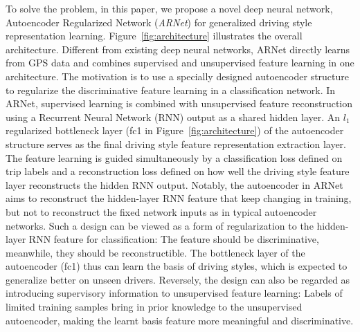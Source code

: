 \documentclass{article}
\begin{document}
To solve the problem, in this paper, we propose a novel deep neural network, {A}utoencoder {R}egularized {Net}work (\emph{ARNet}) for generalized driving style representation learning.
Figure~\ref{fig:architecture} illustrates the overall architecture.
Different from existing deep neural networks, ARNet directly learns from GPS data and combines supervised and unsupervised feature learning in one architecture.
The motivation is to use a specially designed autoencoder structure to regularize the discriminative feature learning in a classification network.
In ARNet, %
supervised learning is combined with unsupervised feature reconstruction using a Recurrent Neural Network (RNN) \cite{elman1990finding,chung2014empirical} output as a shared hidden layer.
An $l_1$ regularized bottleneck layer (fc1 in Figure~\ref{fig:architecture}) of the autoencoder structure %
serves as the final driving style feature representation extraction layer.
The feature learning is guided simultaneously by a classification loss defined on trip labels and a reconstruction loss defined on how well the driving style feature layer reconstructs the hidden RNN output.
Notably, the autoencoder in ARNet aims to reconstruct the hidden-layer RNN feature that keep changing in training, but not to reconstruct the fixed network inputs as in typical autoencoder networks.
Such a design can be viewed as a form of regularization to the hidden-layer RNN feature for classification: The feature should be discriminative, meanwhile, they should be reconstructible.
The bottleneck layer of the autoencoder (fc1) thus can learn the basis of driving styles, which is expected to generalize better on unseen drivers.
Reversely, the design can also be regarded as introducing supervisory information to unsupervised feature learning:
Labels of limited training samples bring in prior knowledge to the unsupervised autoencoder, making the learnt basis feature more meaningful and discriminative.
\end{document}
